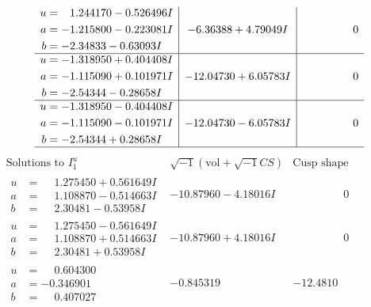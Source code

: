 \documentclass[1p]{elsarticle_modified}
\theoremstyle{definition}
\newcommand{\I}{\sqrt{-1}}
\begin{document}
$$\begin{array}{c|c|c}
\begin{aligned}
u &= \phantom{-}1.244170 - 0.526496 I \\
a &= -1.215800 - 0.223081 I \\
b &= -2.34833 - 0.63093 I\end{aligned}
 & -6.36388 + 4.79049 I & \phantom{-0.000000 } 0 \\ \hline\begin{aligned}
u &= -1.318950 + 0.404408 I \\
a &= -1.115090 + 0.101971 I \\
b &= -2.54344 - 0.28658 I\end{aligned}
 & -12.04730 + 6.05783 I & \phantom{-0.000000 } 0 \\ \hline\begin{aligned}
u &= -1.318950 - 0.404408 I \\
a &= -1.115090 - 0.101971 I \\
b &= -2.54344 + 0.28658 I\end{aligned}
 & -12.04730 - 6.05783 I & \phantom{-0.000000 } 0\\
 \hline 
 \end{array}$$\newpage$$\begin{array}{c|c|c}  
\text{Solutions to }I^u_{1}& \I (\text{vol} + \sqrt{-1}CS) & \text{Cusp shape}\\
 \hline 
\begin{aligned}
u &= \phantom{-}1.275450 + 0.561649 I \\
a &= \phantom{-}1.108870 - 0.514663 I \\
b &= \phantom{-}2.30481 - 0.53958 I\end{aligned}
 & -10.87960 - 4.18016 I & \phantom{-0.000000 } 0 \\ \hline\begin{aligned}
u &= \phantom{-}1.275450 - 0.561649 I \\
a &= \phantom{-}1.108870 + 0.514663 I \\
b &= \phantom{-}2.30481 + 0.53958 I\end{aligned}
 & -10.87960 + 4.18016 I & \phantom{-0.000000 } 0 \\ \hline\begin{aligned}
u &= \phantom{-}0.604300\phantom{ +0.000000I} \\
a &= -0.346901\phantom{ +0.000000I} \\
b &= \phantom{-}0.407027\phantom{ +0.000000I}\end{aligned}
 & -0.845319\phantom{ +0.000000I} & -12.4810\phantom{ +0.000000I} \\ \hline\begin{aligned}

\end{aligned}
\end{array}$$
\end{document}
